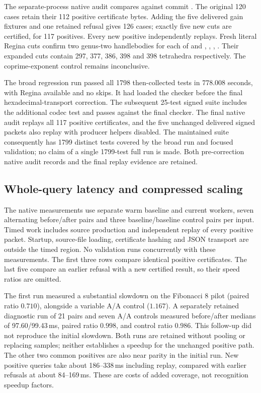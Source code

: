 The separate-process native audit compares against commit
.  The original 120 cases retain their 112 positive
certificate bytes.  Adding the five delivered gain fixtures and one
retained refusal gives 126 cases; exactly five new cuts are certified,
for 117 positives.  Every new positive independently replays.  Fresh
literal Regina cuts confirm two genus-two handlebodies for each of
 and
, ,
, .  Their expanded cuts contain
297, 377, 386, 398 and 398 tetrahedra respectively.  The coprime-exponent
control  remains inconclusive.

The broad regression run passed all 1798 then-collected tests in
778.008 seconds, with Regina available and no skips.  It had loaded the
checker before the final hexadecimal-transport correction.  The subsequent
25-test signed suite includes the additional codec test and passes against
the final checker.  The final native audit replays all 117 positive
certificates, and the five unchanged delivered signed packets also replay
with producer helpers disabled.  The maintained suite consequently has
1799 distinct tests covered by the broad run and focused validation; no
claim of a single 1799-test full run is made.  Both pre-correction native
audit records and the final replay evidence are retained.

\subsection{Whole-query latency and compressed scaling}

The native measurements use separate warm baseline and current workers,
seven alternating before/after pairs and three baseline/baseline control
pairs per input.  Timed work includes source production and independent
replay of every positive packet.  Startup, source-file loading, certificate
hashing and JSON transport are outside the timed region.  No validation
runs concurrently with these measurements.  The first three rows compare
identical positive certificates.  The last five compare an earlier refusal
with a new certified result, so their speed ratios are omitted.



The first run measured a substantial slowdown on the Fibonacci 8 pilot
(paired ratio $0.710$), alongside a variable A/A control ($1.167$).
A separately retained diagnostic run of 21 pairs and seven A/A controls
measured before/after medians of 97.60/99.43\,ms, paired ratio $0.998$,
and control ratio $0.986$.  This follow-up did not reproduce the initial
slowdown.  Both runs are retained without pooling or replacing samples;
neither establishes a speedup for the unchanged positive path.  The other
two common positives are also near parity in the initial run.  New positive
queries take about 186--338\,ms including replay, compared with earlier
refusals at about 84--169\,ms.  These are costs of added coverage, not
recognition speedup factors.

